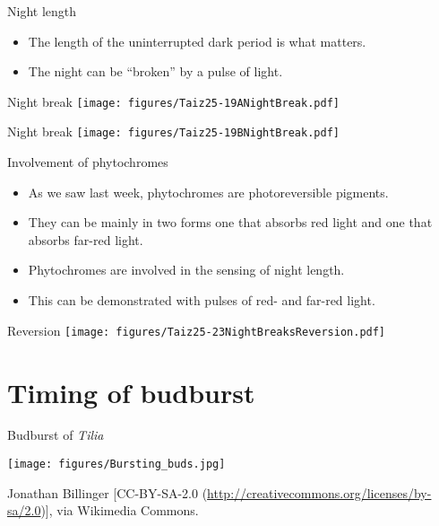 \documentclass[10pt]{beamer}
\begin{document}
\begin{frame}{Night length}
    \begin{itemize}
        \item The length of the uninterrupted dark period is what matters.
        \item The night can be ``broken'' by a pulse of light.
    \end{itemize}
\end{frame}

\begin{frame}{Night break}
    \centering
    \texttt{[image: figures/Taiz25-19ANightBreak.pdf]}\\
    {\small \autocite[from][]{TaiZei2006}}
\end{frame}

\begin{frame}{Night break}
    \centering
    \texttt{[image: figures/Taiz25-19BNightBreak.pdf]}\\
    {\small \autocite[from][]{TaiZei2006}}
\end{frame}

\begin{frame}{Involvement of phytochromes}
    \begin{itemize}
        \item As we saw last week, phytochromes are photoreversible pigments.
        \item They can be mainly in two forms one that absorbs red light and one that absorbs far-red light.
        \item Phytochromes are involved in the sensing of night length.
        \item This can be demonstrated with pulses of red- and far-red light.
    \end{itemize}
\end{frame}

\begin{frame}{Reversion}
    \centering
    \texttt{[image: figures/Taiz25-23NightBreaksReversion.pdf]}\\
    {\small \autocite[from][]{TaiZei2006}}
\end{frame}


\section{Timing of budburst}

\begin{frame}{Budburst of \emph{Tilia}}
    \begin{centering}
    \texttt{[image: figures/Bursting\_buds.jpg]}\\
    \end{centering}
    {\small Jonathan Billinger [CC-BY-SA-2.0 (\url{http://creativecommons.org/licenses/by-sa/2.0})], via Wikimedia Commons.}
\end{frame}
\end{document}
